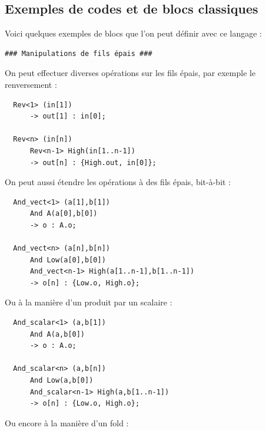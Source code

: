 \documentclass[13pt]{article}
\begin{document}
\subsection{Exemples de codes et de blocs classiques}
Voici quelques exemples de blocs que l'on peut définir avec ce langage :

\begin{verbatim}
### Manipulations de fils épais ###
\end{verbatim}

On peut effectuer diverses opérations sur les fils épais, par exemple le
renversement :

\begin{verbatim}
  Rev<1> (in[1])
      -> out[1] : in[0];

  Rev<n> (in[n])
      Rev<n-1> High(in[1..n-1])
      -> out[n] : {High.out, in[0]};
\end{verbatim}

On peut aussi étendre les opérations à des fils épais, bit-à-bit :

\begin{verbatim}
  And_vect<1> (a[1],b[1])
      And A(a[0],b[0])
      -> o : A.o;

  And_vect<n> (a[n],b[n])
      And Low(a[0],b[0])
      And_vect<n-1> High(a[1..n-1],b[1..n-1])
      -> o[n] : {Low.o, High.o};
\end{verbatim}

Ou à la manière d'un produit par un scalaire :

\begin{verbatim}
  And_scalar<1> (a,b[1])
      And A(a,b[0])
      -> o : A.o;

  And_scalar<n> (a,b[n])
      And Low(a,b[0])
      And_scalar<n-1> High(a,b[1..n-1])
      -> o[n] : {Low.o, High.o};
\end{verbatim}

Ou encore à la manière d'un fold :
\end{document}
